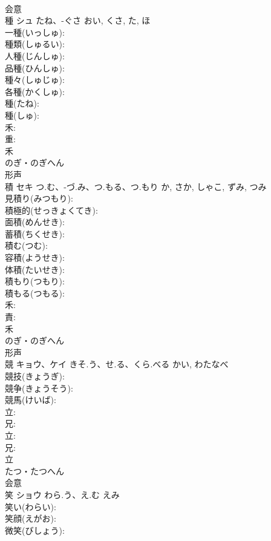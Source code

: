 \documentclass[8pt]{extreport}
\begin{document}
\begin{CJK}{UTF8}{min}
\\	会意 
\\	種	シュ	たね、-ぐさ	おい, くさ, た, ほ	
\\	一種(いっしゅ): 
\\	種類(しゅるい): 
\\	人種(じんしゅ): 
\\	品種(ひんしゅ): 
\\	種々(しゅじゅ): 
\\	各種(かくしゅ): 
\\	種(たね): 
\\	種(しゅ): 
\\	禾: 
\\	重: 
\\	禾	
\\	のぎ・のぎへん	
\\	形声 
\\	積	セキ	つ.む、-づ.み、つ.もる、つ.もり	か, さか, しゃこ, ずみ, つみ	
\\	見積り(みつもり): 
\\	積極的(せっきょくてき): 
\\	面積(めんせき): 
\\	蓄積(ちくせき): 
\\	積む(つむ): 
\\	容積(ようせき): 
\\	体積(たいせき): 
\\	積もり(つもり): 
\\	積もる(つもる): 
\\	禾: 
\\	責: 
\\	禾	
\\	のぎ・のぎへん	
\\	形声 
\\	競	キョウ、ケイ	きそ.う、せ.る、くら.べる	かい, わたなべ	
\\	競技(きょうぎ): 
\\	競争(きょうそう): 
\\	競馬(けいば): 
\\	立: 
\\	兄: 
\\	立: 
\\	兄: 
\\	立	
\\	たつ・たつへん	
\\	会意 
\\	笑	ショウ	わら.う、え.む	えみ	
\\	笑い(わらい): 
\\	笑顔(えがお): 
\\	微笑(びしょう): 

\end{CJK}
\end{document}
